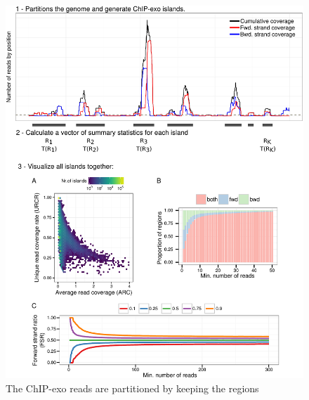 \documentclass{bmcart}\usepackage[]{graphicx}\usepackage[]{color}
\begin{document}
\begin{figure}[h!]
  \centering
  \includegraphics[width = \textwidth]{../figs/for_paper/coverage_diagram3.pdf}
  \caption{The ChIP-exo reads are partitioned by keeping the regions
}
\end{figure}
\end{document}
